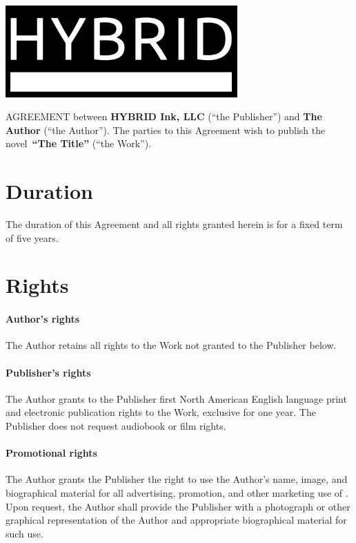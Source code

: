 \documentclass[12pt,letterpaper]{article}
\def\WorkTitle{The Title}
\def\WorkAuthor{The Author}
\def\WorkType{novel}
\begin{document}
\begin{center}
\noindent\includegraphics[width=3.5in]{logo}
\end{center}

\vspace{0.5in}

\noindent AGREEMENT between \textbf{HYBRID Ink, LLC} (``the Publisher'') and \textbf{\WorkAuthor} (``the Author''). The parties to this Agreement wish to publish the \WorkType\ \textbf{``\WorkTitle''} (``the Work'').

\section{Duration}

The duration of this Agreement and all rights granted herein is for a fixed term of five years.

\section{Rights}

\paragraph{Author's rights}

The Author retains all rights to the Work not granted to the Publisher below.

\paragraph{Publisher's rights}

The Author grants to the Publisher first North American English language print and electronic publication rights to the Work, exclusive for one year. The Publisher does not request audiobook or film rights.

\paragraph{Promotional rights}

The Author grants the Publisher the right to use the Author’s name, image, and biographical material for all advertising, promotion, and other marketing use of \TheWork. Upon request, the Author shall provide the Publisher with a photograph or other graphical representation of the Author and appropriate biographical material for such use.
\end{document}
